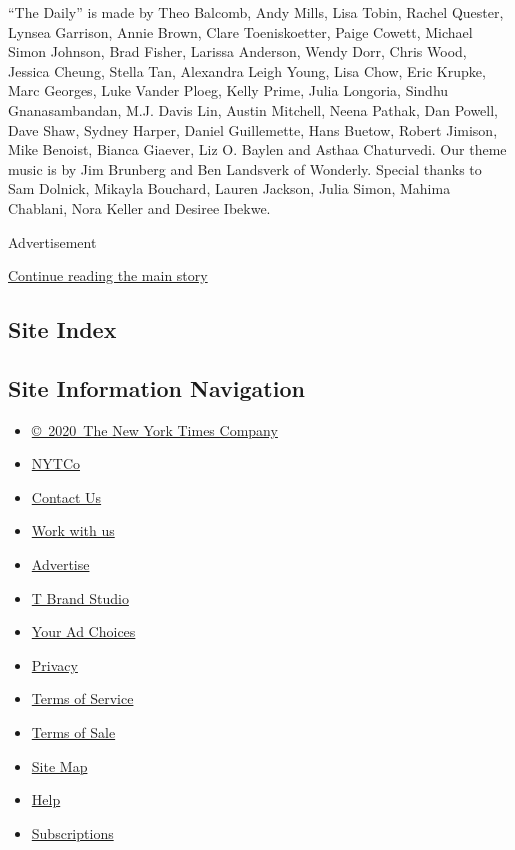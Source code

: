 ``The Daily'' is made by Theo Balcomb, Andy Mills, Lisa Tobin, Rachel
Quester, Lynsea Garrison, Annie Brown, Clare Toeniskoetter, Paige
Cowett, Michael Simon Johnson, Brad Fisher, Larissa Anderson, Wendy
Dorr, Chris Wood, Jessica Cheung, Stella Tan, Alexandra Leigh Young,
Lisa Chow, Eric Krupke, Marc Georges, Luke Vander Ploeg, Kelly Prime,
Julia Longoria, Sindhu Gnanasambandan, M.J. Davis Lin, Austin Mitchell,
Neena Pathak, Dan Powell, Dave Shaw, Sydney Harper, Daniel Guillemette,
Hans Buetow, Robert Jimison, Mike Benoist, Bianca Giaever, Liz O. Baylen
and Asthaa Chaturvedi. Our theme music is by Jim Brunberg and Ben
Landsverk of Wonderly. Special thanks to Sam Dolnick, Mikayla Bouchard,
Lauren Jackson, Julia Simon, Mahima Chablani, Nora Keller and Desiree
Ibekwe.

Advertisement

\protect\hyperlink{after-bottom}{Continue reading the main story}

\hypertarget{site-index}{%
\subsection{Site Index}\label{site-index}}

\hypertarget{site-information-navigation}{%
\subsection{Site Information
Navigation}\label{site-information-navigation}}

\begin{itemize}
\tightlist
\item
  \href{https://help.nytimes.com/hc/en-us/articles/115014792127-Copyright-notice}{©~2020~The
  New York Times Company}
\end{itemize}

\begin{itemize}
\tightlist
\item
  \href{https://www.nytco.com/}{NYTCo}
\item
  \href{https://help.nytimes.com/hc/en-us/articles/115015385887-Contact-Us}{Contact
  Us}
\item
  \href{https://www.nytco.com/careers/}{Work with us}
\item
  \href{https://nytmediakit.com/}{Advertise}
\item
  \href{http://www.tbrandstudio.com/}{T Brand Studio}
\item
  \href{https://www.nytimes.com/privacy/cookie-policy\#how-do-i-manage-trackers}{Your
  Ad Choices}
\item
  \href{https://www.nytimes.com/privacy}{Privacy}
\item
  \href{https://help.nytimes.com/hc/en-us/articles/115014893428-Terms-of-service}{Terms
  of Service}
\item
  \href{https://help.nytimes.com/hc/en-us/articles/115014893968-Terms-of-sale}{Terms
  of Sale}
\item
  \href{https://spiderbites.nytimes.com}{Site Map}
\item
  \href{https://help.nytimes.com/hc/en-us}{Help}
\item
  \href{https://www.nytimes.com/subscription?campaignId=37WXW}{Subscriptions}
\end{itemize}
